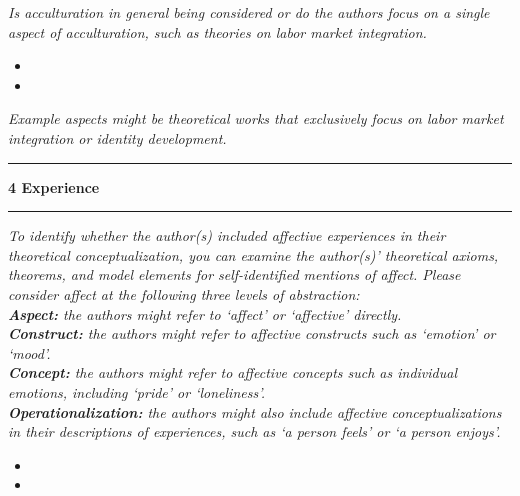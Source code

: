 \documentclass[10pt,a4paper]{protocol}
\newlength{\rulewidth}
\newlength{\ruleandnamegap}
\newcommand{\namefont}{\tiny}
\newcommand{\ruleandname}[2]{%
  \par\noindent
  \rule{#2}{\rulewidth}\par
  \vspace{\dimexpr-\baselineskip+\ruleandnamegap}
  \noindent{\namefont #1}\par
  \addvspace{\baselineskip}
}
\newcommand\category[2]{
{\Large\bfseries\color{emphasis} \vspace{0.25em} #1 \hspace{0.5em} #2 \\ [-0.6em] \rule{\textwidth}{0.4pt} \vspace{0.25em}}
}
\begin{document}
\textit{Is acculturation in general being considered or do the authors focus on a single aspect of acculturation, such as theories on labor market integration.}
\vspace{0.5em}
\begin{itemize}
	\item {}
	\item {}
\end{itemize}
\divider

\textit{Example aspects might be theoretical works that exclusively focus on labor market integration or identity development.}
\vspace{1.5em}
\ruleandname{character string}{5cm}
\divider

\category{4}{Experience}

\textit{To identify whether the author(s) included affective experiences in their theoretical conceptualization, you can examine the author(s)' theoretical axioms, theorems, and model elements for self-identified mentions of affect. Please consider affect at the following three levels of abstraction:\\
\textbf{Aspect:} the authors might refer to `affect' or `affective' directly.\\
\textbf{Construct:} the authors might refer to affective constructs such as `emotion' or `mood'.\\
\textbf{Concept:} the authors might refer to affective concepts such as individual emotions, including `pride' or `loneliness'.\\
\textbf{Operationalization:} the authors might also include affective conceptualizations in their descriptions of experiences, such as `a person feels' or `a person enjoys'.}
\vspace{0.5em}
\begin{itemize}
	\item {}
	\item {}
\end{itemize}
\divider
\end{document}
